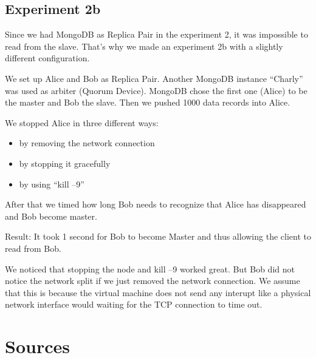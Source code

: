 \documentclass{llncs}
\begin{document}
\subsection{Experiment 2b}

Since we had MongoDB as Replica Pair in the experiment 2, it was
impossible to read from the slave. That's why we made an experiment
2b with a slightly different configuration.

We set up Alice and Bob as Replica Pair. Another MongoDB instance
``Charly'' was used as arbiter (Quorum Device). MongoDB chose the
first one (Alice) to be the master and Bob the slave. Then we
pushed 1000 data records into Alice.

We stopped Alice in three different ways:

\begin{itemize}
\item
  by removing the network connection
\item
  by stopping it gracefully
\item
  by using ``kill --9''
\end{itemize}
After that we timed how long Bob needs to recognize that Alice has
disappeared and Bob become master.

Result: It took 1 second for Bob to become Master and thus allowing
the client to read from Bob.

We noticed that stopping the node and kill --9 worked great. But
Bob did not notice the network split if we just removed the network
connection. We assume that this is because the virtual machine does
not send any interupt like a physical network interface would
waiting for the TCP connection to time out.

\section{Sources}
\end{document}
